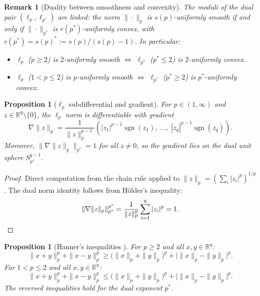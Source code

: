 \documentclass[11pt]{article}
\newtheorem{proposition}[theorem]{Proposition}
\newtheorem{remark}{Remark}
\newcommand{\R}{\mathbb{R}}
\newcommand{\pstar}{p^*}
\begin{document}
\begin{remark}[Duality between smoothness and convexity]\label{rem:duality}
The moduli of the dual pair $(\ell_p, \ell_{\pstar})$ are linked: the norm $\|\cdot\|_p$ is $s(p)$-uniformly smooth if and only if $\|\cdot\|_{\pstar}$ is $r(\pstar)$-uniformly convex, with $r(\pstar) = s(p)^* := s(p)/(s(p)-1)$. In particular:
\begin{itemize}
\item $\ell_p$ ($p \ge 2$) is $2$-uniformly smooth $\Longleftrightarrow$ $\ell_{\pstar}$ ($\pstar \le 2$) is $2$-uniformly convex.
\item $\ell_p$ ($1 < p \le 2$) is $p$-uniformly smooth $\Longleftrightarrow$ $\ell_{\pstar}$ ($\pstar \ge 2$) is $\pstar$-uniformly convex.
\end{itemize}
\end{remark}

\begin{proposition}[$\ell_p$ subdifferential and gradient]\label{prop:lp-gradient}
For $p \in (1,\infty)$ and $z \in \R^q \setminus \{0\}$, the $\ell_p$ norm is differentiable with gradient
\begin{equation}\label{eq:lp-gradient}
\nabla \|z\|_p = \frac{1}{\|z\|_p^{p-1}} \left( |z_1|^{p-1}\operatorname{sgn}(z_1),\; \ldots,\; |z_q|^{p-1}\operatorname{sgn}(z_q) \right).
\end{equation}
Moreover, $\|\nabla \|z\|_p\|_{\pstar} = 1$ for all $z \neq 0$, so the gradient lies on the dual unit sphere $S_{\pstar}^{q-1}$.
\end{proposition}

\begin{proof}
Direct computation from the chain rule applied to $\|z\|_p = (\sum_i |z_i|^p)^{1/p}$. The dual norm identity follows from H\"older's inequality:
\[
\|\nabla \|z\|_p\|_{\pstar}^{\pstar} = \frac{1}{\|z\|_p^{p}} \sum_{i=1}^q |z_i|^{p} = 1. \qedhere
\]
\end{proof}

\begin{proposition}[Hanner's inequalities {\cite{Hanner1956}}]\label{prop:hanner}
For $p \ge 2$ and all $x, y \in \R^q$:
\begin{equation}\label{eq:hanner-pge2}
\|x+y\|_p^p + \|x-y\|_p^p \ge \bigl(\|x\|_p + \|y\|_p\bigr)^p + \bigl|\|x\|_p - \|y\|_p\bigr|^p.
\end{equation}
For $1 < p \le 2$ and all $x, y \in \R^q$:
\begin{equation}\label{eq:hanner-ple2}
\|x+y\|_p^p + \|x-y\|_p^p \le \bigl(\|x\|_p + \|y\|_p\bigr)^p + \bigl|\|x\|_p - \|y\|_p\bigr|^p.
\end{equation}
The reversed inequalities hold for the dual exponent $\pstar$.
\end{proposition}
\end{document}
